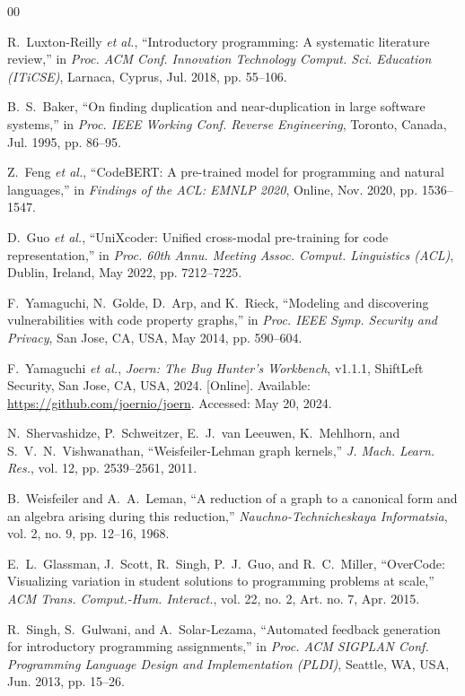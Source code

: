 \begin{thebibliography}{00}

R.~Luxton-Reilly \emph{et al.}, ``Introductory programming: A systematic literature review,'' in \emph{Proc. ACM Conf. Innovation Technology Comput. Sci. Education (ITiCSE)}, Larnaca, Cyprus, Jul. 2018, pp. 55--106.

B.~S.~Baker, ``On finding duplication and near-duplication in large software systems,'' in \emph{Proc. IEEE Working Conf. Reverse Engineering}, Toronto, Canada, Jul. 1995, pp. 86--95.

Z.~Feng \emph{et al.}, ``CodeBERT: A pre-trained model for programming and natural languages,'' in \emph{Findings of the ACL: EMNLP 2020}, Online, Nov. 2020, pp. 1536--1547.

D.~Guo \emph{et al.}, ``UniXcoder: Unified cross-modal pre-training for code representation,'' in \emph{Proc. 60th Annu. Meeting Assoc. Comput. Linguistics (ACL)}, Dublin, Ireland, May 2022, pp. 7212--7225.

F.~Yamaguchi, N.~Golde, D.~Arp, and K.~Rieck, ``Modeling and discovering vulnerabilities with code property graphs,'' in \emph{Proc. IEEE Symp. Security and Privacy}, San Jose, CA, USA, May 2014, pp. 590--604.

F.~Yamaguchi \emph{et al.}, \emph{Joern: The Bug Hunter's Workbench}, v1.1.1, ShiftLeft Security, San Jose, CA, USA, 2024. [Online]. Available: \url{https://github.com/joernio/joern}. Accessed: May 20, 2024.

N.~Shervashidze, P.~Schweitzer, E.~J.~van Leeuwen, K.~Mehlhorn, and S.~V.~N.~Vishwanathan, ``Weisfeiler-Lehman graph kernels,'' \emph{J. Mach. Learn. Res.}, vol. 12, pp. 2539--2561, 2011.

B.~Weisfeiler and A.~A.~Leman, ``A reduction of a graph to a canonical form and an algebra arising during this reduction,'' \emph{Nauchno-Technicheskaya Informatsia}, vol. 2, no. 9, pp. 12--16, 1968.

E.~L.~Glassman, J.~Scott, R.~Singh, P.~J.~Guo, and R.~C.~Miller, ``OverCode: Visualizing variation in student solutions to programming problems at scale,'' \emph{ACM Trans. Comput.-Hum. Interact.}, vol. 22, no. 2, Art. no. 7, Apr. 2015.

R.~Singh, S.~Gulwani, and A.~Solar-Lezama, ``Automated feedback generation for introductory programming assignments,'' in \emph{Proc. ACM SIGPLAN Conf. Programming Language Design and Implementation (PLDI)}, Seattle, WA, USA, Jun. 2013, pp. 15--26.


\end{thebibliography}

